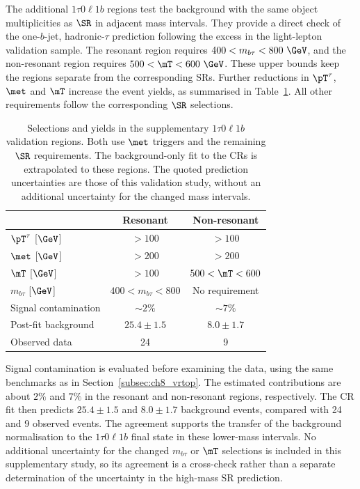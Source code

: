 The additional $1\tau0\ell1b$ regions test the background with the same object multiplicities as $\SR$ in adjacent mass intervals.
They provide a direct check of the one-$b$-jet, hadronic-$\tau$ prediction following the excess in the light-lepton validation sample.
The resonant region requires $400<m_{b\tau}<800~\GeV$, and the non-resonant region requires $500<\mT<600~\GeV$.
These upper bounds keep the regions separate from the corresponding SRs.
Further reductions in $\pT^\tau$, $\met$ and $\mT$ increase the event yields, as summarised in Table~\ref{tab:ch8_tau1b_vr}.
All other requirements follow the corresponding $\SR$ selections.

\begin{table}[htbp]
    \centering
    \small
    \caption{Selections and yields in the supplementary $1\tau0\ell1b$ validation regions. Both use $\met$ triggers and the remaining $\SR$ requirements. The background-only fit to the CRs is extrapolated to these regions. The quoted prediction uncertainties are those of this validation study, without an additional uncertainty for the changed mass intervals.}
    \label{tab:ch8_tau1b_vr}
    \begin{tabular}{lcc}
        \toprule
         & Resonant & Non-resonant \\
        \midrule
        $\pT^\tau$ [$\GeV$] & $>100$ & $>100$ \\
        $\met$ [$\GeV$] & $>200$ & $>200$ \\
        $\mT$ [$\GeV$] & $>100$ & $500<\mT<600$ \\
        $m_{b\tau}$ [$\GeV$] & $400<m_{b\tau}<800$ & No requirement \\
        \midrule
        Signal contamination & $\sim2\%$ & $\sim7\%$ \\
        Post-fit background & $25.4\pm1.5$ & $8.0\pm1.7$ \\
        Observed data & 24 & 9 \\
        \bottomrule
    \end{tabular}
\end{table}

Signal contamination is evaluated before examining the data, using the same benchmarks as in Section~\ref{subsec:ch8_vrtop}.
The estimated contributions are about $2\%$ and $7\%$ in the resonant and non-resonant regions, respectively.
The CR fit then predicts $25.4\pm1.5$ and $8.0\pm1.7$ background events, compared with 24 and 9 observed events.
The agreement supports the transfer of the background normalisation to the $1\tau0\ell1b$ final state in these lower-mass intervals.
No additional uncertainty for the changed $m_{b\tau}$ or $\mT$ selections is included in this supplementary study, so its agreement is a cross-check rather than a separate determination of the uncertainty in the high-mass SR prediction.
